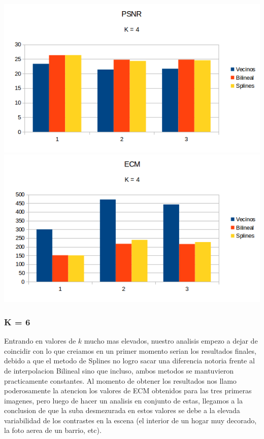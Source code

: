 \begin{center}
\includegraphics[scale=0.50]{imagenes/K4PSNR.png}
\includegraphics[scale=0.50]{imagenes/K4ECM.png}
\end{center}

\subsubsection{K = 6}
Entrando en valores de $k$ mucho mas elevados, nuestro analisis empezo a dejar de coincidir con lo que creiamos en un primer momento serian los resultados finales, debido a que el metodo de Splines no logro sacar una diferencia notoria frente al de interpolacion Bilineal sino que incluso, ambos metodos se mantuvieron practicamente constantes.  Al momento de obtener los resultados nos llamo poderosamente la atencion los valores de ECM obtenidos para las tres primeras imagenes, pero luego de hacer un analisis en conjunto de estas, llegamos a la conclusion de que la suba desmezurada en estos valores se debe a la elevada variabilidad de los contrastes en la escena (el interior de un hogar muy decorado, la foto aerea de un barrio, etc). 

